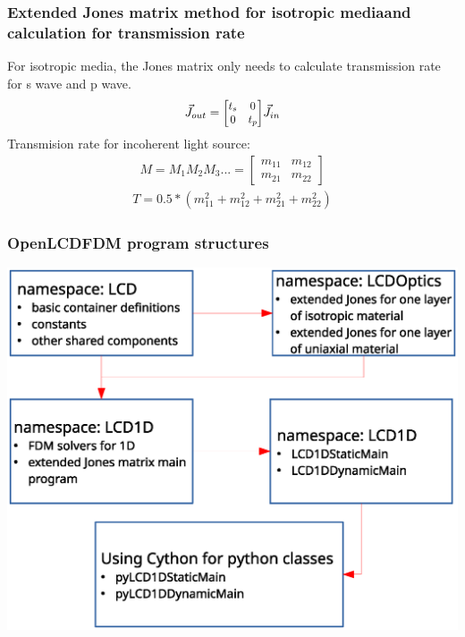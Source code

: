\documentclass{beamer}
\newcommand\scalemath[2]{\scalebox{#1}{\mbox{\ensuremath{\displaystyle #2}}}} %
\begin{document}
\begin{frame}
\frametitle{Extended Jones matrix method for isotropic mediaand calculation for transmission rate}
For isotropic media, the Jones matrix only needs to calculate transmission rate for s wave and p wave.
\begin{eqnarray}
\vec{J}_{out} = 
\scalemath{0.9}{
\begin{bmatrix}
{t}_s & 0 \\ 0 & {t}_p
\end{bmatrix}
}
\vec{J}_{in} \nonumber
\nonumber
\label{eq:extendedJones_iso}
\end{eqnarray}
Transmision rate for incoherent light source:
\begin{eqnarray}
M = M_1M_2M_3... = 
\begin{bmatrix}
m_{11} & m_{12} \\ m_{21} & m_{22}
\end{bmatrix}
\nonumber
\end{eqnarray}
\begin{eqnarray}
T = 0.5*(m_{11}^2 + m_{12}^2 + m_{21}^2 + m_{22}^2) \nonumber
\end{eqnarray}
\end{frame}
\begin{frame}
\frametitle{OpenLCDFDM program structures}
\begin{center}
\includegraphics[scale=0.4]{openlcdfdm_structure.eps}
\end{center}
\end{frame}
\end{document}
